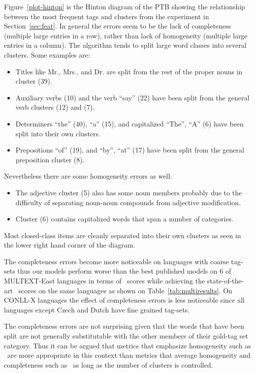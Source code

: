 Figure~\ref{plot-hinton} is the Hinton diagram of the PTB showing the
relationship between the most frequent tags and clusters from the
experiment in Section~\ref{sec:feat}.  In general the errors seem to
be the lack of completeness (multiple large entries in a row), rather
than lack of homogeneity (multiple large entries in a column).  The
algorithm tends to split large word classes into several clusters.
Some examples are:
\begin{itemize}
\item Titles like Mr., Mrs., and Dr. are split from the rest of the
  proper nouns in cluster (39).
\item Auxiliary verbs (10) and the verb ``say'' (22) have been split
  from the general verb clusters (12) and (7).
\item Determiners ``the'' (40), ``a'' (15), and capitalized
  ``The'', ``A'' (6) have been split into their own clusters.
\item Prepositions ``of'' (19), and ``by'', ``at'' (17) have been
  split from the general preposition cluster (8).
\end{itemize}
Nevertheless there are some homogeneity errors as well:
\begin{itemize} 
\item The adjective cluster (5) also has some noun members probably
  due to the difficulty of separating noun-noun compounds from
  adjective modification.
\item Cluster (6) contains capitalized words that span a number of
  categories.
\end{itemize}
Most closed-class items are cleanly separated into their own clusters
as seen in the lower right hand corner of the diagram. 

The completeness errors become more noticeable on languages with
coarse tag-sets thus our models perform worse than the best published
models on 6 of MULTEXT-East languages in terms of \vm\ scores while
achieving the state-of-the-art \mto\ scores on the same languages as
shown on Table~\ref{tab:multiresults}.  On CONLL-X languages the
effect of completeness errors is less noticeable since all languages
except Czech and Dutch have fine grained tag-sets.

The completeness errors are not surprising given that the words that
have been split are not generally substitutable with the other members
of their gold-tag set category.  Thus it can be argued that metrics
that emphasize homogeneity such as \mto\ are more appropriate in this
context than metrics that average homogeneity and completeness such as
\vm\ as long as the number of clusters is controlled.

